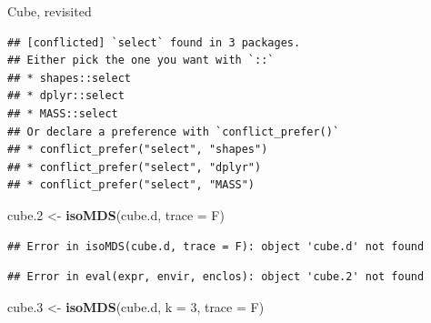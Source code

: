 \documentclass[ignorenonframetext,]{beamer}
\newenvironment{Shaded}{\begin{snugshade}}{\end{snugshade}}
\newcommand{\DataTypeTok}[1]{\textcolor[rgb]{0.13,0.29,0.53}{#1}}
\newcommand{\DecValTok}[1]{\textcolor[rgb]{0.00,0.00,0.81}{#1}}
\newcommand{\FloatTok}[1]{\textcolor[rgb]{0.00,0.00,0.81}{#1}}
\newcommand{\KeywordTok}[1]{\textcolor[rgb]{0.13,0.29,0.53}{\textbf{#1}}}
\newcommand{\NormalTok}[1]{#1}
\newcommand{\OperatorTok}[1]{\textcolor[rgb]{0.81,0.36,0.00}{\textbf{#1}}}
\newcommand{\StringTok}[1]{\textcolor[rgb]{0.31,0.60,0.02}{#1}}
\begin{document}
\begin{frame}[fragile]{Cube, revisited}
\protect\hypertarget{cube-revisited}{}

\begin{Shaded}
\end{Shaded}

\begin{verbatim}
## [conflicted] `select` found in 3 packages.
## Either pick the one you want with `::` 
## * shapes::select
## * dplyr::select
## * MASS::select
## Or declare a preference with `conflict_prefer()`
## * conflict_prefer("select", "shapes")
## * conflict_prefer("select", "dplyr")
## * conflict_prefer("select", "MASS")
\end{verbatim}

\begin{Shaded}
\begin{Highlighting}[]
\NormalTok{cube}\FloatTok{.2}\NormalTok{ <-}\StringTok{ }\KeywordTok{isoMDS}\NormalTok{(cube.d, }\DataTypeTok{trace =}\NormalTok{ F)}
\end{Highlighting}
\end{Shaded}

\begin{verbatim}
## Error in isoMDS(cube.d, trace = F): object 'cube.d' not found
\end{verbatim}

\begin{Shaded}
\end{Shaded}

\begin{verbatim}
## Error in eval(expr, envir, enclos): object 'cube.2' not found
\end{verbatim}

\begin{Shaded}
\begin{Highlighting}[]
\NormalTok{cube}\FloatTok{.3}\NormalTok{ <-}\StringTok{ }\KeywordTok{isoMDS}\NormalTok{(cube.d, }\DataTypeTok{k =} \DecValTok{3}\NormalTok{, }\DataTypeTok{trace =}\NormalTok{ F)}
\end{Highlighting}
\end{Shaded}


\end{frame}
\end{document}
